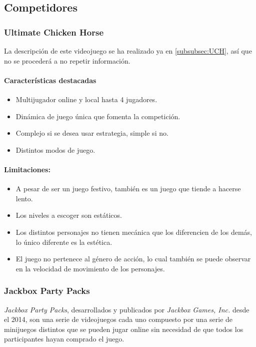 \subsection{Competidores}

\subsubsection{Ultimate Chicken Horse}

La descripción de este videojuego se ha realizado ya en \ref{subsubsec:UCH}, así
que no se procederá a no repetir información.

\paragraph{Características destacadas}
\begin{itemize}
    \item Multijugador online y local hasta 4 jugadores.
    \item Dinámica de juego única que fomenta la competición.
    \item Complejo si se desea usar estrategia, simple si no.
    \item Distintos modos de juego.
\end{itemize}

\paragraph{Limitaciones:}
\begin{itemize}
    \item A pesar de ser un juego festivo, también es un juego que tiende a
    hacerse lento.
    \item Los niveles a escoger son estáticos.
    \item Los distintos personajes no tienen mecánica que los diferencien de los
    demás, lo único diferente es la estética.
    \item El juego no pertenece al género de acción, lo cual también se puede
    observar en la velocidad de movimiento de los personajes.
\end{itemize}

\subsubsection{Jackbox Party Packs}
\emph{Jackbox Party Packs}, desarrollados y publicados por \emph{Jackbox Games,
Inc.} desde el 2014, son una serie de videojuegos cada uno compuesto por una
serie de minijuegos distintos que se pueden jugar online sin necesidad de que
todos los participantes hayan comprado el juego.

